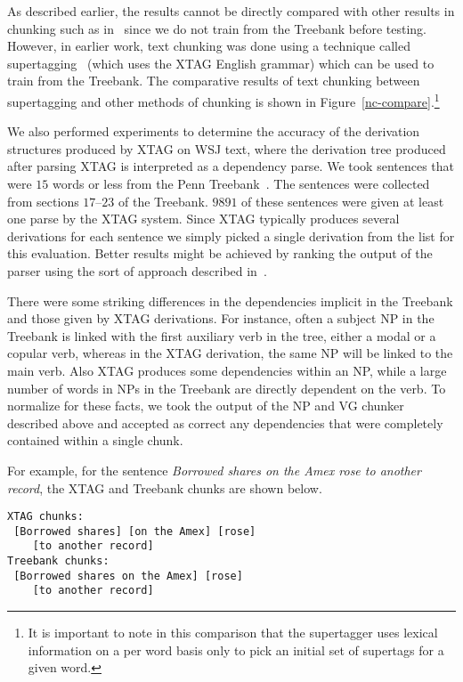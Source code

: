 As described earlier, the results cannot be directly compared with 
other results in chunking such as in~\cite{lance&mitch95} since we do 
not train from the Treebank before testing. However, in earlier work, 
text chunking was done using a technique called 
supertagging~\cite{srini97iwpt} (which uses the XTAG English grammar) 
which can be used to train from the Treebank.  The comparative results 
of text chunking between supertagging and other methods of chunking is 
shown in Figure~\ref{nc-compare}.\footnote{It is important to note in   this comparison that the supertagger uses lexical information on a   per word basis only to pick an initial set of supertags for a given   word.} 
 
We also performed experiments to determine the accuracy of the 
derivation structures produced by XTAG on WSJ text, where the 
derivation tree produced after parsing XTAG is interpreted as a 
dependency parse. We took sentences that were $15$ words or less from 
the Penn Treebank~\cite{marcus93}. The sentences were collected from 
sections $17$--$23$ of the Treebank. $9891$ of these sentences were 
given at least one parse by the XTAG system. Since XTAG typically 
produces several derivations for each sentence we simply picked a 
single derivation from the list for this evaluation. Better results 
might be achieved by ranking the output of the parser using the sort 
of approach described in~\cite{srinietal95}. 
 
There were some striking differences in the dependencies implicit in 
the Treebank and those given by XTAG derivations. For instance, often 
a subject NP in the Treebank is linked with the first auxiliary verb 
in the tree, either a modal or a copular verb, whereas in the XTAG 
derivation, the same NP will be linked to the main verb. Also XTAG 
produces some dependencies within an NP, while a large number of words 
in NPs in the Treebank are directly dependent on the verb. To 
normalize for these facts, we took the output of the NP and VG chunker 
described above and accepted as correct any dependencies that were 
completely contained within a single chunk. 
 
For example, for the sentence {\em Borrowed shares on the Amex rose to another record}, the XTAG and Treebank chunks are shown below. 
 
\begin{verbatim} 
XTAG chunks:     
 [Borrowed shares] [on the Amex] [rose] 
    [to another record] 
Treebank chunks: 
 [Borrowed shares on the Amex] [rose] 
    [to another record] 
\end{verbatim} 
 
